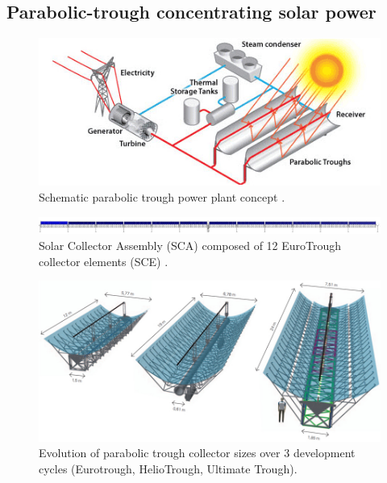 \pagebreak
\subsection{Parabolic-trough concentrating solar power} \label{subsection_PTC}


\begin{figure}[htbp] 
\centering
\includegraphics[width=0.7\linewidth]{FIG/parabolic_troughs}
\caption[Schematic parabolic trough power plant concept.]{Schematic parabolic trough power plant concept \cite{U.S.DOE2013}.}\label{parabolic_troughs}
\end{figure}

\begin{figure}[htbp] 
\centering
\includegraphics[width=1\linewidth]{FIG/SCA_EuroTrough}
\caption[Solar Collector Assembly (SCA) composed of 12 EuroTrough collector elements (SCE).]{Solar Collector Assembly (SCA) composed of 12 EuroTrough collector elements (SCE) \cite{VonReeken2014}.}\label{SCA_EuroTrough}
\end{figure}

\pagebreak
\begin{figure}[htbp] 
\centering
\includegraphics[width=1\linewidth]{FIG/Kollektoren}
\caption[Evolution of parabolic trough collector sizes over 3 development cycles (Eurotrough, HelioTrough, Ultimate Trough).]{Evolution of parabolic trough collector sizes over 3 development cycles (Eurotrough, HelioTrough, Ultimate Trough)\cite{Schlaichbergermannundpartner}.}\label{Kollektoren}
\end{figure}


